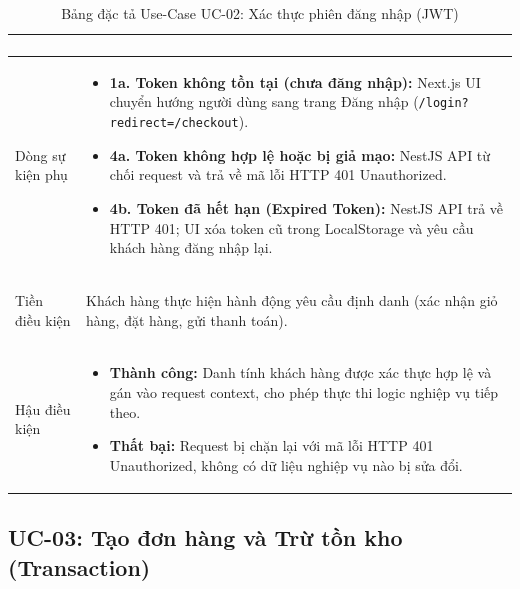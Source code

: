 \documentclass[12pt,a4paper]{article}
\begin{document}
\begin{table}[H]
\begin{tabularx}{\textwidth}{|>{\bfseries\raggedright\arraybackslash}p{3.2cm}|>{\raggedright\arraybackslash}X|}
\begin{enumerate}[leftmargin=*,itemsep=2pt,topsep=2pt,parsep=0pt,partopsep=0pt]
\end{enumerate} \\
\hline
Dòng sự kiện phụ & 
\begin{itemize}[leftmargin=*,itemsep=2pt,topsep=2pt,parsep=0pt,partopsep=0pt]
    \item \textbf{1a. Token không tồn tại (chưa đăng nhập):} Next.js UI chuyển hướng người dùng sang trang Đăng nhập (\texttt{/login?redirect=/checkout}).
    \item \textbf{4a. Token không hợp lệ hoặc bị giả mạo:} NestJS API từ chối request và trả về mã lỗi HTTP 401 Unauthorized.
    \item \textbf{4b. Token đã hết hạn (Expired Token):} NestJS API trả về HTTP 401; UI xóa token cũ trong LocalStorage và yêu cầu khách hàng đăng nhập lại.
\end{itemize} \\
\hline
Tiền điều kiện & Khách hàng thực hiện hành động yêu cầu định danh (xác nhận giỏ hàng, đặt hàng, gửi thanh toán). \\
\hline
Hậu điều kiện & 
\begin{itemize}[leftmargin=*,itemsep=2pt,topsep=2pt,parsep=0pt,partopsep=0pt]
    \item \textbf{Thành công:} Danh tính khách hàng được xác thực hợp lệ và gán vào request context, cho phép thực thi logic nghiệp vụ tiếp theo.
    \item \textbf{Thất bại:} Request bị chặn lại với mã lỗi HTTP 401 Unauthorized, không có dữ liệu nghiệp vụ nào bị sửa đổi.
\end{itemize} \\
\hline
\end{tabularx}
\caption{Bảng đặc tả Use-Case UC-02: Xác thực phiên đăng nhập (JWT)}
\label{tab:uc-02}
\end{table}

\subsection{UC-03: Tạo đơn hàng và Trừ tồn kho (Transaction)}
\end{document}
